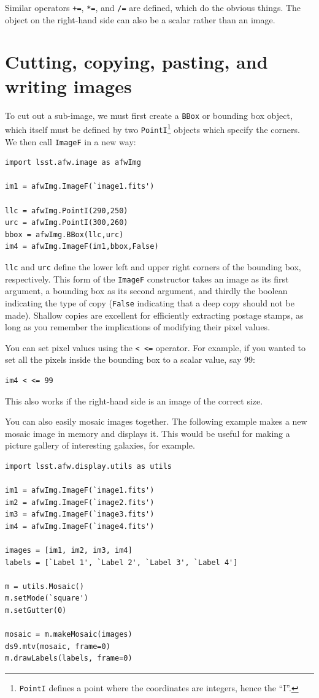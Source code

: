 Similar operators \texttt{+=}, \texttt{*=}, and \texttt{/=} are
defined, which do the obvious things.  The object on the right-hand
side can also be a scalar rather than an image.

\section{Cutting, copying, pasting, and writing images}

To cut out a sub-image, we must first create a \texttt{BBox} or
bounding box object, which itself must be defined by two
\texttt{PointI}\footnote{\texttt{PointI} defines a point where the
 coordinates are integers, hence the ``I''.}  objects which specify
the corners.  We then call \texttt{ImageF} in a new way:

\begin{verbatim}
import lsst.afw.image as afwImg

im1 = afwImg.ImageF(`image1.fits')

llc = afwImg.PointI(290,250)
urc = afwImg.PointI(300,260)
bbox = afwImg.BBox(llc,urc)
im4 = afwImg.ImageF(im1,bbox,False)
\end{verbatim}

\texttt{llc} and \texttt{urc} define the lower left and upper right
corners of the bounding box, respectively.  This form of the
\texttt{ImageF} constructor takes an image as its first argument, a
bounding box as its second argument, and thirdly the boolean
indicating the type of copy (\texttt{False} indicating that a deep
copy should not be made).  Shallow copies are excellent for
efficiently extracting postage stamps, as long as you remember the
implications of modifying their pixel values.

You can set pixel values using the \texttt{< <=} operator.  For
example, if you wanted to set all the pixels inside the bounding box to a
scalar value, say 99:

\begin{verbatim}
im4 < <= 99
\end{verbatim}

This also works if the right-hand side is an image of the correct size.

You can also easily mosaic images together.  The following example
makes a new mosaic image in memory and displays it.  This would be
useful for making a picture gallery of interesting galaxies, for
example.

\begin{verbatim}
import lsst.afw.display.utils as utils

im1 = afwImg.ImageF(`image1.fits')
im2 = afwImg.ImageF(`image2.fits')
im3 = afwImg.ImageF(`image3.fits')
im4 = afwImg.ImageF(`image4.fits')

images = [im1, im2, im3, im4]
labels = [`Label 1', `Label 2', `Label 3', `Label 4']

m = utils.Mosaic()
m.setMode(`square')
m.setGutter(0)

mosaic = m.makeMosaic(images)
ds9.mtv(mosaic, frame=0)
m.drawLabels(labels, frame=0)
\end{verbatim}

